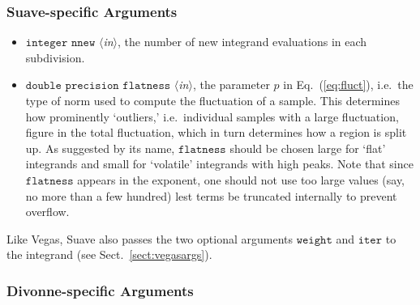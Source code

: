 \documentclass[12pt]{article}
\newcommand\ie{i.e.\ }
\newcommand\Code[1]{\ensuremath{\texttt{#1}}}
\newcommand\VarIn[1]{\item\Code{#1} \textit{$\langle$in\/$\rangle$},}
\begin{document}
\subsubsection{Suave-specific Arguments}

\begin{itemize}
\VarIn{integer nnew}
the number of new integrand evaluations in each subdivision.

\VarIn{double precision flatness}
the parameter $p$ in Eq.~(\ref{eq:fluct}), \ie the type of norm used to
compute the fluctuation of a sample.  This determines how prominently
`outliers,' \ie individual samples with a large fluctuation, figure in
the total fluctuation, which in turn determines how a region is split
up.  As suggested by its name, \Code{flatness} should be chosen large
for `flat' integrands and small for `volatile' integrands with high
peaks.  Note that since \Code{flatness} appears in the exponent, one
should not use too large values (say, no more than a few hundred) lest
terms be truncated internally to prevent overflow.
\end{itemize}

Like Vegas, Suave also passes the two optional arguments \Code{weight}
and \Code{iter} to the integrand (see Sect.~\ref{sect:vegasargs}).


\subsubsection{Divonne-specific Arguments}
\label{sect:divonneargs}
\end{document}
